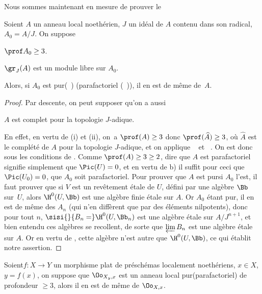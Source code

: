 Nous sommes maintenant en mesure de prouver le
\enlargethispage{-1\baselineskip}%
\begin{theoreme} \label{XII.4.7}
Soient $A$ un anneau local noeth\'erien, $J$ un id\'eal de $A$ contenu dans son radical, $A_0=A/J$. On suppose
\begin{enumeratei}
\item
$\prof A_0\geq 3$.
\item
$\gr_J(A)$ est un module libre sur $A_0$.
\end{enumeratei}
\noindent
Alors, si $A_0$ est \og pur\fg (~) (\resp parafactoriel (~)), il en est de m\^eme de~$A$.
\end{theoreme}

\begin{proof}
Par descente, on peut supposer qu'on a aussi
\begin{enumeratei}\setcounter{enumi}{2}
\item
$A$ est complet pour la topologie $J$-adique.
\end{enumeratei}

En effet, en vertu de (i) et (ii), on~a $\prof(A)\geq 3$ donc $\prof(\widehat{A})\geq 3$, o\`u $\widehat{A}$ est le compl\'et\'e de $A$ pour la topologie $J$-adique, et on applique ~ et ~. On est donc sous les conditions de . Comme $\prof(A)\geq 3\geq 2$, dire que $A$ est parafactoriel signifie simplement que $\Pic(U)=0$, et en vertu de  b) il suffit pour ceci que $\Pic(U_0)=0$, \ie que $A_0$ soit parafactoriel. Pour prouver que $A$ est \og pur\fg si $A_0$ l'est, il faut prouver que si $V$ est un rev\^etement \'etale de $U$, d\'efini par une alg\`ebre $\Bb$ sur~$U$, alors $\H^0(U, \Bb)$ est une alg\`ebre finie \'etale sur $A$. Or $A_0$ \'etant pur, il en est de m\^eme des $A_n$ (qui n'en diff\`erent que par des \'el\'ements nilpotents), donc pour tout $n$, $\sisi{}{B_n=}\H^0(U, \Bb_n)$ est une alg\`ebre \'etale sur $A/J^{n+1}$, et bien entendu ces alg\`ebres se recollent, de sorte que $\varprojlim B_n$ est une alg\`ebre \'etale sur $A$. Or en vertu de , cette alg\`ebre n'est autre que $\H^0(U, \Bb)$, ce qui \'etablit notre assertion.
\skipqed
\end{proof}

\begin{corollaire} \label{XII.4.8}
Soient\pageoriginale $f:X\to Y$ un morphisme plat de pr\'esch\'emas localement noeth\'eriens, $x\in X$, $y=f(x)$, on suppose que $\Oo_{X_y, x}$ est un anneau local \og pur\fg (\resp parafactoriel) de profondeur $\geq 3$, alors il en est de m\^eme de $\Oo_{X, x}$.
\end{corollaire}

